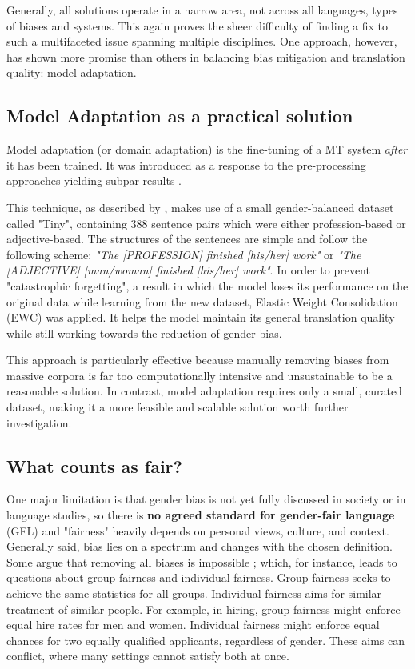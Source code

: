 Generally, all solutions operate in a narrow area, not across all languages, types of biases and systems. This again proves the sheer difficulty of finding a fix to such a multifaceted issue spanning multiple disciplines. One approach, however, has shown more promise than others in balancing bias mitigation and translation quality: model adaptation.

\subsection{Model Adaptation as a practical solution}
Model adaptation (or domain adaptation) is the fine-tuning of a MT system \textit{after} it has been trained. It was introduced as a response to the pre-processing approaches yielding subpar results \citep{tomalinPracticalEthicsBias2021}.

This technique, as described by \citet{tomalinPracticalEthicsBias2021}, makes use of a small gender-balanced dataset called "Tiny", containing 388 sentence pairs which were either profession-based or adjective-based. The structures of the sentences are simple and follow the following scheme: \textit{"The [PROFESSION] finished [his/her] work"} or \textit{"The [ADJECTIVE] [man/woman] finished [his/her] work"}. In order to prevent "catastrophic forgetting", a result in which the model loses its performance on the original data while learning from the new dataset, Elastic Weight Consolidation (EWC) was applied. It helps the model maintain its general translation quality while still working towards the reduction of gender bias.

This approach is particularly effective because manually removing biases from massive corpora is far too computationally intensive and unsustainable to be a reasonable solution. In contrast, model adaptation requires only a small, curated dataset, making it a more feasible and scalable solution worth further investigation.

\subsection{What counts as fair?}

One major limitation is that gender bias is not yet fully discussed in society or in language studies, so there is \textbf{no agreed standard for gender-fair language} (GFL) \citep{lardelliBuildingBridgesDataset2024, savoldiDecadeGenderBias2025} and "fairness" heavily depends on personal views, culture, and context. Generally said, bias lies on a spectrum and changes with the chosen definition. Some argue that removing all biases is impossible \citep{ullmannGenderBiasMachine2022}; which, for instance, leads to questions about group fairness and individual fairness. Group fairness seeks to achieve the same statistics for all groups. Individual fairness aims for similar treatment of similar people. For example, in hiring, group fairness might enforce equal hire rates for men and women. Individual fairness might enforce equal chances for two equally qualified applicants, regardless of gender. These aims can conflict, where many settings cannot satisfy both at once. 

